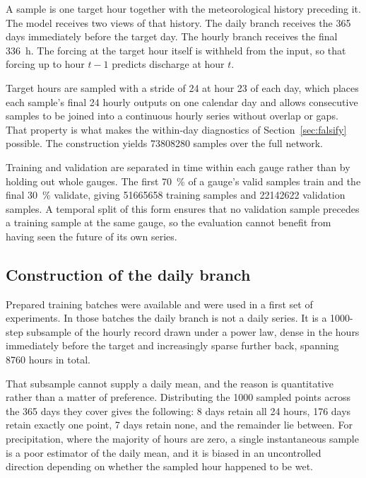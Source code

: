 \documentclass[11pt,a4paper]{article}
\begin{document}
A sample is one target hour together with the meteorological history preceding it. The
model receives two views of that history. The daily branch receives the \num{365} days
immediately before the target day. The hourly branch receives the final \SI{336}{\hour}. The
forcing at the target hour itself is withheld from the input, so that forcing up to hour
$t-1$ predicts discharge at hour $t$.

Target hours are sampled with a stride of \num{24} at hour 23 of each day, which places each
sample's final \num{24} hourly outputs on one calendar day and allows consecutive samples to
be joined into a continuous hourly series without overlap or gaps. That property is what
makes the within-day diagnostics of Section~\ref{sec:falsify} possible. The construction
yields \num{73808280} samples over the full network.

Training and validation are separated in time within each gauge rather than by holding out
whole gauges. The first \SI{70}{\percent} of a gauge's valid samples train and the final
\SI{30}{\percent} validate, giving \num{51665658} training samples and \num{22142622}
validation samples. A temporal split of this form ensures that no validation sample precedes
a training sample at the same gauge, so the evaluation cannot benefit from having seen the
future of its own series.

\subsection{Construction of the daily branch}

Prepared training batches were available and were used in a first set of experiments. In
those batches the daily branch is not a daily series. It is a \num{1000}-step subsample of
the hourly record drawn under a power law, dense in the hours immediately before the target
and increasingly sparse further back, spanning \num{8760} hours in total.

That subsample cannot supply a daily mean, and the reason is quantitative rather than a
matter of preference. Distributing the \num{1000} sampled points across the \num{365} days
they cover gives the following: \num{8} days retain all \num{24} hours, \num{176} days retain
exactly one point, \num{7} days retain none, and the remainder lie between. For
precipitation, where the majority of hours are zero, a single instantaneous sample is a poor
estimator of the daily mean, and it is biased in an uncontrolled direction depending on
whether the sampled hour happened to be wet.
\end{document}
